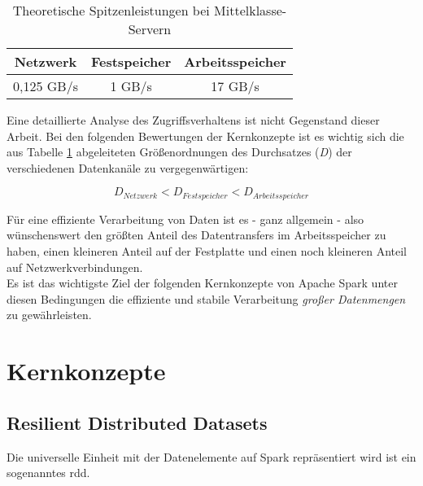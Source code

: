 \begin{table}[ht]
	\centering %
	\begin{tabular}{c c c} %
		\hline\hline %
		Netzwerk & Festspeicher & Arbeitsspeicher\\ [0.5ex] %
		\hline %
		0,125 GB/s & 1 GB/s & 17 GB/s \\ %
		\hline %
	\end{tabular}
	\caption{Theoretische Spitzenleistungen bei Mittelklasse-Servern} %
	\label{table:vgldurchsatz} %
\end{table}

Eine detaillierte Analyse des Zugriffsverhaltens ist nicht Gegenstand dieser Arbeit. Bei den folgenden Bewertungen der Kernkonzepte ist es wichtig sich die aus Tabelle \ref{table:vgldurchsatz} abgeleiteten Größenordnungen des Durchsatzes (\textit{D}) der verschiedenen Datenkanäle zu vergegenwärtigen:

\begin{equation*}
	D_{Netzwerk} < D_{Festspeicher} < D_{Arbeitsspeicher}
\end{equation*}

Für eine effiziente Verarbeitung von Daten ist es - ganz allgemein - also wünschenswert den größten Anteil des Datentransfers im Arbeitsspeicher zu haben, einen kleineren Anteil auf der Festplatte und einen noch kleineren Anteil auf Netzwerkverbindungen.\\

Es ist das wichtigste Ziel der folgenden Kernkonzepte von Apache Spark unter diesen Bedingungen die effiziente und stabile Verarbeitung \textit{großer Datenmengen}\cite{Sam14} zu gewährleisten.\\

\section{Kernkonzepte}

\subsection{Resilient Distributed Datasets}
Die universelle Einheit mit der Datenelemente auf Spark repräsentiert wird ist ein sogenanntes \gls{rdd}\cite{Mat12}.\\

